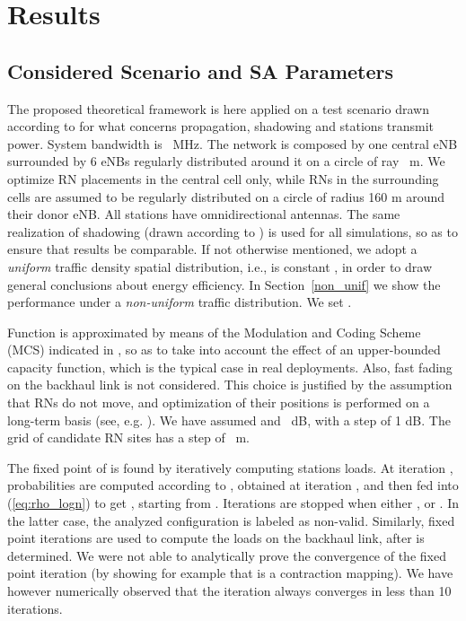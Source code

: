 \documentclass[draftcls,onecolumn]{IEEEtran}
\theoremstyle{plain}
\theoremstyle{definition}
\begin{document}
\section{Results}\label{results}



\subsection{Considered Scenario and SA Parameters}
The proposed theoretical framework is here applied on a test scenario drawn according to \cite[case 1]{3gpprelayperf} for what concerns propagation, shadowing and stations transmit power. System bandwidth is ~MHz. The network is composed by one central eNB surrounded by 6 eNBs regularly distributed around it on a circle of ray ~m. We optimize RN placements in the central cell only, while RNs in the surrounding cells are assumed to be regularly distributed on a circle of radius 160 m around their donor eNB. All stations have omnidirectional antennas. The same realization of shadowing (drawn according to \cite{3gpprelayperf}) is used for all simulations, so as to ensure that results be comparable. If not otherwise mentioned, we adopt a {\it uniform} traffic density spatial distribution, i.e.,  is constant , in order to draw general conclusions about energy efficiency. In Section~\ref{non_unif} we show the performance under a {\it non-uniform} traffic distribution. We set . 

Function  is approximated by means of the Modulation and Coding Scheme (MCS) indicated in \cite{36.942}, so as to take into account the effect of an upper-bounded capacity function, which is the typical case in real deployments. Also, fast fading on the backhaul link is not considered. This choice is justified by the assumption that RNs do not move, and optimization of their positions is performed on a long-term basis (see, e.g. \cite{salehFF}). 
We have assumed  and ~dB, with a step of 1 dB. The grid of candidate RN sites has a step of ~m.
    


The fixed point of  is found by iteratively computing stations loads. At iteration , probabilities  are computed according to , obtained at iteration , and then fed into (\ref{eq:rho_logn}) to get , starting from . Iterations are stopped when either , or . In the latter case, the analyzed configuration is labeled as non-valid.  
Similarly, fixed point iterations are used to compute the loads on the backhaul link, after  is determined. We were not able to analytically prove the convergence of the fixed point iteration (by showing for example that  is a contraction mapping). We have however numerically observed that the iteration always converges in less than 10 iterations.
\end{document}
